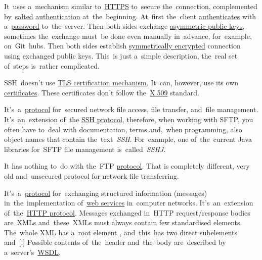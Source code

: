 It~uses a~mechanism similar to~\hyperref[https]{HTTPS} to~secure the~connection, complemented by~\hyperref[salt]{salted} \hyperref[authenticationauthorization]{authentication} at~the~beginning.
At~first the~client \hyperref[authenticationauthorization]{authenticates} with a~\hyperref[keypassword]{password} to~the~server.
Then both sides exchange \hyperref[asymmetriccryptography]{asymmetric public keys}, sometimes the~exchange must~be done even manually in~advance, for~example, on~Git~hubs.
Then both sides establish \hyperref[symmetriccryptography]{symmetrically encrypted} connection using exchanged public keys.
This~is just a~simple description, the~real set of~steps is~rather complicated.

SSH~doesn't use \hyperref[tls]{TLS certification mechanism}.
It~can, however, use its own \hyperref[certificate]{certificates}.
These certificates don't follow the~\hyperref[x509]{\mbox{X.509}} standard.

\label{sftp}
It's~a~\hyperref[protocolstandard]{protocol} for~secured network file access, file transfer, and~file management.
It's~an~extension of~the \hyperref[ssh]{SSH protocol}, therefore, when working with SFTP, you often have to~deal with documentation, terms and,~when programming, also object names that contain the~text~\textit{SSH}.
For~example, one of~the~current Java libraries for~SFTP file management is~called~\textit{SSHJ}.

\warning It has nothing to~do with the~FTP \hyperref[protocolstandard]{protocol}.
That is completely different, very old and~unsecured protocol for network file transferring.

\label{soap}
It's~a~\hyperref[protocolstandard]{protocol} for~exchanging structured information (messages) in~the~implementation of~\hyperref[webserviceapplication]{web services} in~computer networks.
It's~an~extension of~the~\hyperref[http]{HTTP protocol}.
Messages exchanged in~HTTP request/response bodies are~XMLs and~these~XMLs must always contain few standardised elements.
The~whole XML has a~root element , and~this~has two direct subelements  and~[.]
Possible contents of~the~header and~the~body are~described by \mbox{a server's \hyperref[wsdl]{WSDL}}.
